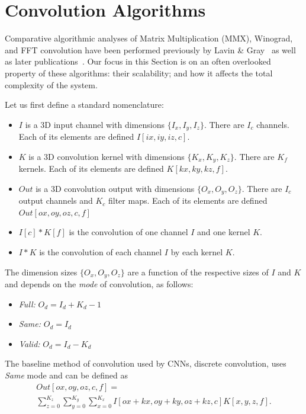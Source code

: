 \documentclass[
  10pt,
  \FORMAT-MODE,
  \REVIEW-MODE,
  \TWOSIDE-MODE
]{IEEEtran}
\begin{document}
\section{Convolution Algorithms}\label{sec:alg}
  Comparative algorithmic analyses of Matrix Multiplication (MMX), Winograd, and FFT convolution have been performed previously by Lavin \& Gray~\cite{lavin2016fast} as well as later publications~\cite{shen2018towards}. Our focus in this Section is on an often overlooked property of these algorithms: their scalability; and how it affects the total complexity of the system.

  Let us first define a standard nomenclature:
  \begin{itemize}
    \item $I$ is a 3D input channel with dimensions $\{I_x,I_y,I_z\}$. There are $I_c$ channels. Each of its elements are defined $I[ix, iy, iz, c]$.
    \item $K$ is a 3D convolution kernel with dimensions $\{K_x,K_y,K_z\}$. There are $K_f$ kernels. Each of its elements are defined $K[kx, ky, kz, f]$.
    \item $Out$ is a 3D convolution output with dimensions $\{O_x,O_y,O_z\}$. There are $I_c$ output channels and $K_c$ filter maps. Each of its elements are defined $Out[ox, oy, oz, c, f]$
    \item $I[c]*K[f]$ is the convolution of one channel $I$ and one kernel $K$.
    \item $I*K$ is the convolution of each channel $I$ by each kernel $K$.
  \end{itemize}

  The dimension sizes $\{O_x,O_y,O_z\}$ are a function of the respective sizes of $I$ and $K$ and depends on the \textit{mode} of convolution, as follows:
  \begin{itemize}
    \item \textit{Full:} $O_d = I_d + K_d - 1$
    \item \textit{Same:} $O_d = I_d$
    \item \textit{Valid:} $O_d = I_d - K_d$
  \end{itemize}
  
  The baseline method of convolution used by CNNs, discrete convolution, uses \textit{Same} mode and can be defined as
  \begin{equation}
    \begin{gathered}
      Out[ox,oy,oz,c,f] = \\\sum_{z=0}^{K_z}\sum_{y=0}^{K_y}\sum_{x=0}^{K_x}I[ox+kx,oy+ky,oz+kz,c]K[x,y,z,f].
    \end{gathered}
  \end{equation}
\end{document}

